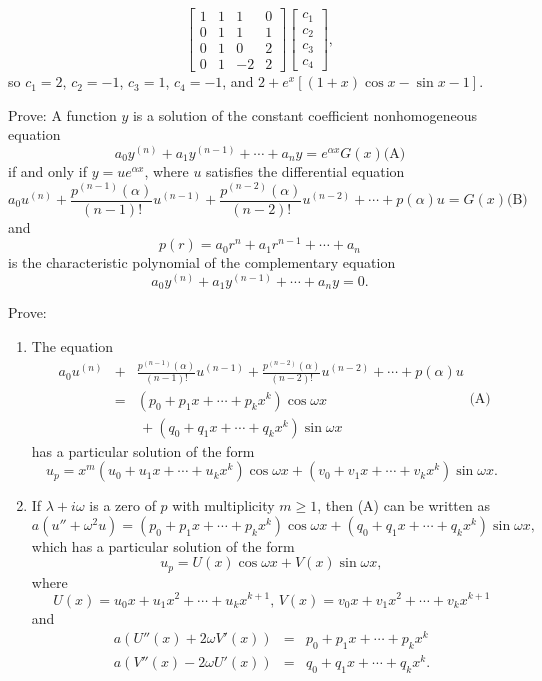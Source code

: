 \documentclass{ximera}
\begin{document}
\begin{problem}
\begin{solution}
$$\left[\begin{array}{cccc}1&1&1&0\\0&1&1&1\\
0&1&0&2\\0&1&-2&2\end{array}\right]
\left[\begin{array}{c}
c_1\\c_2\\c_3\\c_4
\end{array}\right],
$$
so $c_1=2$, $c_2=-1$, $c_3=1$, $c_4=-1$, and
$2 +e^x\left[(1+x)\cos x-\sin x-1\right]$.
\end{solution}
\end{problem}

\begin{problem}\label{exer:9.3.75}
Prove:
A function $y$ is a solution of the constant coefficient
nonhomogeneous equation
$$
a_0y^{(n)}+a_1y^{(n-1)}+\cdots+a_ny=e^{\alpha x}G(x)
\text{(A)}
$$
if and only if $y=ue^{\alpha x}$, where $u$ satisfies the differential
equation
$$
a_0u^{(n)}+\frac{p^{(n-1)}(\alpha)}{(n-1)!}u^{(n-1)}+
\frac{p^{(n-2)}(\alpha)}{(n-2)!}u^{(n-2)}+\cdots+p(\alpha)u=G(x)
\text{(B)}
$$
and
$$
p(r)=a_0r^n+a_1r^{n-1} + \cdots + a_n
$$
is the characteristic polynomial of the complementary equation
$$
a_0y^{(n)}+a_1y^{(n-1)}+\cdots+a_ny=0.
$$
\end{problem}

\begin{problem}\label{exer:9.3.76}
Prove:
\begin{enumerate}
\item %
The equation
$$
\begin{array}{lcl}
a_0u^{(n)}&+&\frac{p^{(n-1)}(\alpha)}{(n-1)!}u^{(n-1)}+
\frac{p^{(n-2)}(\alpha)}{(n-2)!}u^{(n-2)}+\cdots+p(\alpha)u\\
&=&\left(p_0+p_1x+\cdots+p_kx^k\right)\cos
\omega x\\&&\,+ \left(q_0+q_1x+\cdots+q_kx^k\right)\sin\omega x
\end{array}
\text{(A)}
$$
has a particular solution of the form
$$
u_p=x^m\left(u_0+u_1x+\cdots+u_kx^k\right)\cos\omega x+
\left(v_0+v_1x+\cdots+v_kx^k\right)\sin\omega x.
$$
\item %
If $\lambda+i\omega$ is a zero of $p$ with multiplicity $m\ge1$, then
(A) can be written as
$$
a(u''+\omega^2 u)=
\left(p_0+p_1x+\cdots+p_kx^k\right)\cos\omega x+
\left(q_0+q_1x+\cdots+q_kx^k\right)\sin\omega x,
$$
which has a particular solution of the form
$$
u_p=U(x)\cos\omega x+V(x)\sin\omega x,
$$
where
$$
U(x)=u_0x+u_1x^2+\cdots+u_kx^{k+1},\,V(x)=v_0x+v_1x^2+\cdots+v_kx^{k+1}
$$
and
$$
\begin{array}{rcl}
a(U''(x)+2\omega V'(x))&=&p_0+p_1x+\cdots+p_kx^k\\
a(V''(x)-2\omega U'(x))&=&q_0+q_1x+\cdots+q_kx^k.
\end{array}
$$
\end{enumerate}
\end{problem}
\end{document}
